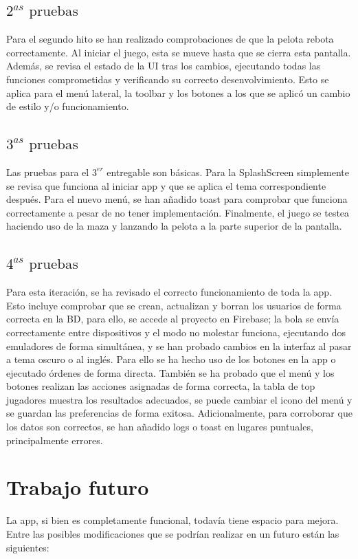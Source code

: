 \documentclass[a4paper,openright,12pt]{article}
\begin{document}
\subsection{$2^{as} \text{ pruebas}$}
Para el segundo hito se han realizado comprobaciones de que la pelota rebota correctamente. Al iniciar el juego, esta se mueve hasta que se cierra esta pantalla. Además, se revisa el estado de la UI tras los cambios, ejecutando todas las funciones comprometidas y verificando su correcto desenvolvimiento. Esto se aplica para el menú lateral, la toolbar y los botones a los que se aplicó un cambio de estilo y/o funcionamiento.


\subsection{$3^{as} \text{ pruebas}$}
Las pruebas para el {$3^{er}$} entregable son básicas. Para la SplashScreen simplemente se revisa que funciona al iniciar app y que se aplica el tema correspondiente después. Para el nuevo menú, se han añadido toast para comprobar que funciona correctamente a pesar de no tener implementación. Finalmente, el juego se testea haciendo uso de la maza y lanzando la pelota a la parte superior de la pantalla.

\subsection{$4^{as} \text{ pruebas}$}
Para esta iteración, se ha revisado el correcto funcionamiento de toda la app. Esto incluye comprobar que se crean, actualizan y borran los usuarios de forma correcta en la BD, para ello, se accede al proyecto en Firebase; la bola se envía correctamente entre dispositivos y el modo no molestar funciona, ejecutando dos emuladores de forma simultánea, y se han probado cambios en la interfaz al pasar a tema oscuro o al inglés. Para ello se ha hecho uso de los botones en la app o ejecutado órdenes de forma directa. También se ha probado que el menú y los botones realizan las acciones asignadas de forma correcta, la tabla de top jugadores muestra los resultados adecuados, se puede cambiar el icono del menú y se guardan las preferencias de forma exitosa. Adicionalmente, para corroborar que los datos son correctos, se han añadido logs o toast en lugares puntuales, principalmente errores.

\section{Trabajo futuro}
La app,  si bien es completamente funcional, todavía tiene espacio para mejora. Entre las posibles modificaciones que se podrían realizar en un futuro están las siguientes:
\end{document}
